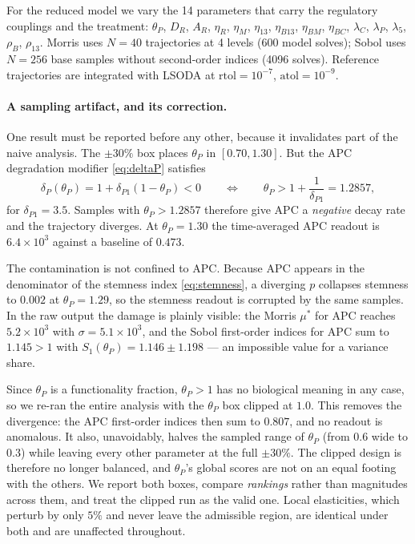 \documentclass[11pt]{article}
\newcommand{\thP}{\theta_P}
\begin{document}
For the reduced model we vary the 14 parameters that carry the regulatory
couplings and the treatment: $\thP$, $D_R$, $A_R$, $\eta_R$, $\eta_M$,
$\eta_{13}$, $\eta_{B13}$, $\eta_{BM}$, $\eta_{BC}$, $\lambda_C$, $\lambda_P$,
$\lambda_5$, $\rho_B$, $\rho_{13}$. Morris uses $N = 40$ trajectories at 4
levels (600 model solves); Sobol uses $N = 256$ base samples without
second-order indices (4096 solves). Reference trajectories are integrated with
LSODA at $\mathrm{rtol}=10^{-7}$, $\mathrm{atol}=10^{-9}$.

\paragraph{A sampling artifact, and its correction.}
One result must be reported before any other, because it invalidates part of
the naive analysis. The $\pm 30\%$ box places $\thP$ in $[0.70, 1.30]$. But the
APC degradation modifier \eqref{eq:deltaP} satisfies
\begin{equation}
\delta_P(\thP) = 1 + \delta_{P1}(1-\thP) < 0
\qquad\Longleftrightarrow\qquad
\thP > 1 + \frac{1}{\delta_{P1}} = 1.2857,
\end{equation}
for $\delta_{P1} = 3.5$. Samples with $\thP > 1.2857$ therefore give APC a
\emph{negative} decay rate and the trajectory diverges. At $\thP = 1.30$ the
time-averaged APC readout is $6.4\times10^{3}$ against a baseline of $0.473$.

The contamination is not confined to APC. Because APC appears in the
denominator of the stemness index \eqref{eq:stemness}, a diverging $p$ collapses
stemness to $0.002$ at $\thP = 1.29$, so the stemness readout is corrupted by
the same samples. In the raw output the damage is plainly visible: the Morris
$\mu^*$ for APC reaches $5.2\times10^{3}$ with $\sigma = 5.1\times10^{3}$, and
the Sobol first-order indices for APC sum to $1.145 > 1$ with
$S_1(\thP) = 1.146 \pm 1.198$ --- an impossible value for a variance share.

Since $\thP$ is a functionality fraction, $\thP > 1$ has no biological meaning
in any case, so we re-ran the entire analysis with the $\thP$ box clipped at
$1.0$. This removes the divergence: the APC first-order indices then sum to
$0.807$, and no readout is anomalous. It also, unavoidably, halves the sampled
range of $\thP$ (from $0.6$ wide to $0.3$) while leaving every other parameter
at the full $\pm 30\%$. The clipped design is therefore no longer balanced, and
$\thP$'s global scores are not on an equal footing with the others. We report
both boxes, compare \emph{rankings} rather than magnitudes across them, and
treat the clipped run as the valid one. Local elasticities, which perturb by
only $5\%$ and never leave the admissible region, are identical under both and
are unaffected throughout.
\end{document}
